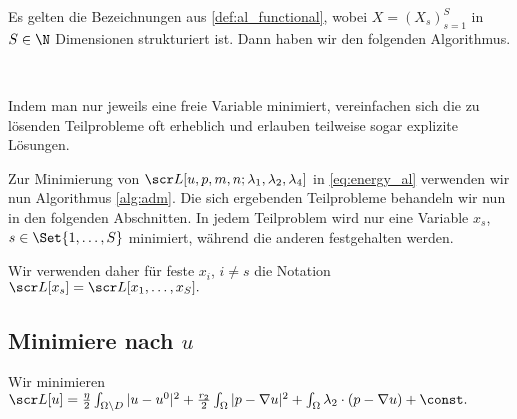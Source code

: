 \documentclass{mythesis}
\begin{document}
\begin{algorithm} \label{alg:adm}
    Es gelten die Bezeichnungen aus \ref{def:al_functional}, wobei $X = (X_s)_{s=1}^S$ in $S \in \N$ Dimensionen strukturiert ist.
    Dann haben wir den folgenden Algorithmus.\\
    \begin{samepage}
    \\
    \begin{algorithmic}
	    \EndFor
	\EndFor
    \end{algorithmic}
    \end{samepage}
\end{algorithm}

Indem man nur jeweils eine freie Variable minimiert, vereinfachen sich die zu lösenden Teilprobleme oft erheblich und erlauben teilweise sogar explizite Lösungen.

Zur Minimierung von $\scr L[u,p,m,n;\lambda_1,\lambda_2,\lambda_4]$ in \eqref{eq:energy_al} verwenden wir nun Algorithmus \ref{alg:adm}.
Die sich ergebenden Teilprobleme behandeln wir nun in den folgenden Abschnitten.
In jedem Teilproblem wird nur eine Variable $x_s$, $s \in \Set{1, \dotsc, S}$ minimiert, während die anderen festgehalten werden.

Wir verwenden daher für feste $x_i$, $i \neq s$ die Notation
\begin{math}
    \scr L[x_s] = \scr L[x_1, \dotsc, x_S].
\end{math}


\subsection*{Minimiere nach $u$}

Wir minimieren
\begin{math}
    \scr L[u] =
    \frac{\eta}{2} \int_{\Omega \setminus D} |u - u^0|^2
    + \frac{r_2}{2} \int_\Omega |p - \nabla u|^2
    + \int_\Omega \lambda_2 \cdot (p - \nabla u)
    + \const.
\end{math}
\end{document}
